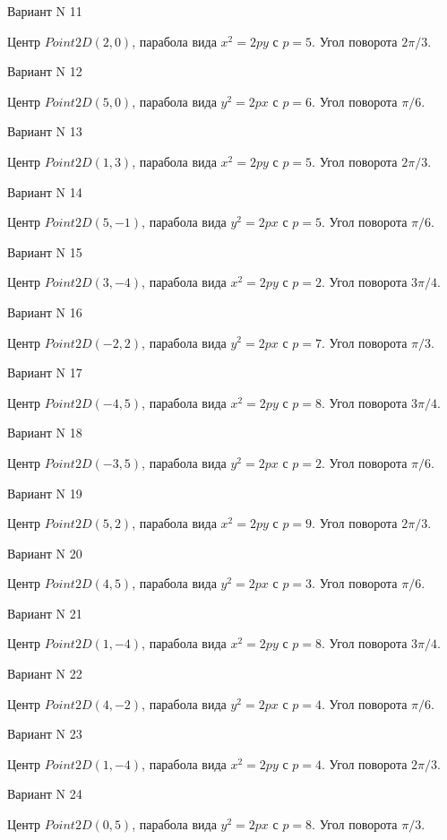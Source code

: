 \documentclass[11pt]{report}
\begin{document}
Вариант N 11

Центр $Point2D\left(2, 0\right)$, парабола вида $x^{2} = 2py$ с $p = 5$. Угол поворота $2 \pi / 3$.

Вариант N 12

Центр $Point2D\left(5, 0\right)$, парабола вида $y^{2} = 2px$ с $p = 6$. Угол поворота $\pi / 6$.

Вариант N 13

Центр $Point2D\left(1, 3\right)$, парабола вида $x^{2} = 2py$ с $p = 5$. Угол поворота $2 \pi / 3$.

Вариант N 14

Центр $Point2D\left(5, -1\right)$, парабола вида $y^{2} = 2px$ с $p = 5$. Угол поворота $\pi / 6$.

Вариант N 15

Центр $Point2D\left(3, -4\right)$, парабола вида $x^{2} = 2py$ с $p = 2$. Угол поворота $3 \pi / 4$.

Вариант N 16

Центр $Point2D\left(-2, 2\right)$, парабола вида $y^{2} = 2px$ с $p = 7$. Угол поворота $\pi / 3$.

Вариант N 17

Центр $Point2D\left(-4, 5\right)$, парабола вида $x^{2} = 2py$ с $p = 8$. Угол поворота $3 \pi / 4$.

Вариант N 18

Центр $Point2D\left(-3, 5\right)$, парабола вида $y^{2} = 2px$ с $p = 2$. Угол поворота $\pi / 6$.

Вариант N 19

Центр $Point2D\left(5, 2\right)$, парабола вида $x^{2} = 2py$ с $p = 9$. Угол поворота $2 \pi / 3$.

Вариант N 20

Центр $Point2D\left(4, 5\right)$, парабола вида $y^{2} = 2px$ с $p = 3$. Угол поворота $\pi / 6$.

Вариант N 21

Центр $Point2D\left(1, -4\right)$, парабола вида $x^{2} = 2py$ с $p = 8$. Угол поворота $3 \pi / 4$.

Вариант N 22

Центр $Point2D\left(4, -2\right)$, парабола вида $y^{2} = 2px$ с $p = 4$. Угол поворота $\pi / 6$.

Вариант N 23

Центр $Point2D\left(1, -4\right)$, парабола вида $x^{2} = 2py$ с $p = 4$. Угол поворота $2 \pi / 3$.

Вариант N 24

Центр $Point2D\left(0, 5\right)$, парабола вида $y^{2} = 2px$ с $p = 8$. Угол поворота $\pi / 3$.
\end{document}
